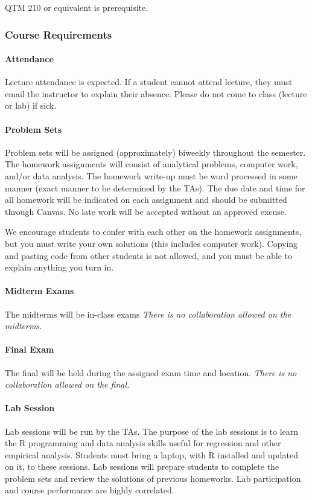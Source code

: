 \documentclass[12pt]{article}
\begin{document}
QTM 210 or equivalent is prerequisite. 

			\subsubsection*{Course Requirements} 
			\paragraph{Attendance} Lecture attendance is expected. If a student cannot attend lecture, they must email the instructor to explain their absence. Please do not come to class (lecture or lab) if sick. 
			
			\paragraph{Problem Sets} Problem sets will be assigned (approximately) biweekly throughout the semester. The homework assignments will consist of analytical problems, computer work, and/or data analysis. The homework write-up must be word processed in some manner (exact manner to be determined by the TAs). The due date and time for all homework will be indicated on each assignment and should be submitted through Canvas. No late work will be accepted without an approved excuse.

We encourage students to confer with each other on the homework assignments, but you must write your own solutions (this includes computer work). Copying and pasting code from other students is not allowed, and you must be able to explain anything you turn in.		
			
			\paragraph{Midterm Exams} The midterms will be in-class exams {\it  There is no collaboration allowed on the midterms.}

			\paragraph{Final Exam}  The final will be held during the assigned exam time and location. {\it  There is no collaboration allowed on the final.}  
			
			\paragraph{Lab Session} Lab sessions will be run by the TAs. The purpose of the lab sessions is to learn the R programming and data analysis skills useful for regression and other empirical analysis. Students must bring a laptop, with R installed and updated on it, to these sessions. Lab sessions will prepare students to complete the problem sets and review the solutions of previous homeworks. Lab participation and course performance are highly correlated. 
			
\end{document}
